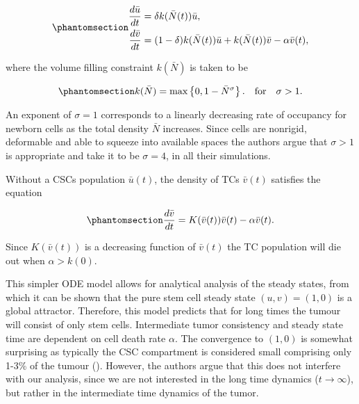 \documentclass[
  letterpaper,
]{scrreprt}
\theoremstyle{definition}
\theoremstyle{remark}
\begin{document}
\begin{equation}\phantomsection\label{eq-ODE-CSC-model}{
\begin{aligned}
    \frac{d \bar{u}}{dt} &= \delta  k(\bar{N}(t)) \bar{u}, \\
    \frac{d \bar{v}}{dt} &= (1-\delta)  k(\bar{N}(t)) \bar{u} + k(\bar{N}(t)) \bar{v} - \alpha \bar{v}(t),
\end{aligned}
}\end{equation}

where the volume filling constraint \(k(\bar{N})\) is taken to be

\begin{equation}\phantomsection\label{eq-volume-filling-constraint}{
k(\bar{N}) = \text{max} \left\{0, 1 - \bar{N}^\sigma \right\}. \quad \text{for} \quad \sigma > 1.
}\end{equation}

An exponent of \(\sigma = 1\) corresponds to a linearly decreasing rate
of occupancy for newborn cells as the total density \(\bar{N}\)
increases. Since cells are nonrigid, deformable and able to squeeze into
available spaces the authors argue that \(\sigma > 1\) is appropriate
and take it to be \(\sigma = 4\), in all their simulations.

Without a CSCs population \(\bar{u}(t)\), the density of TCs
\(\bar{v}(t)\) satisfies the equation

\begin{equation}\phantomsection\label{eq-ODE-TC-only-model}{
\frac{d\bar{v}}{dt}  =K(\bar{v}(t))\bar{v}(t) - \alpha \bar{v}(t).
}\end{equation}

Since \(K(\bar{v}(t))\) is a decreasing function of \(\bar{v}(t)\) the
TC population will die out when \(\alpha > k(0)\).

This simpler ODE model allows for analytical analysis of the steady
states, from which it can be shown that the pure stem cell steady state
\((u,v)= (1,0)\) is a global attractor. Therefore, this model predicts
that for long times the tumour will consist of only stem cells.
Intermediate tumor consistency and steady state time are dependent on
cell death rate \(\alpha\). The convergence to \((1,0)\) is somewhat
surprising as typically the CSC compartment is considered small
comprising only 1-3\% of the tumour (). However, the authors argue that this does not interfere with our
analysis, since we are not interested in the long time dynamics
(\(t \rightarrow \infty\)), but rather in the intermediate time dynamics
of the tumor.
\end{document}
